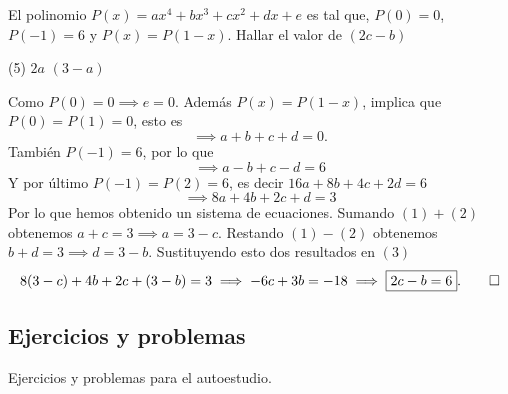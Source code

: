 \begin{example}
    El polinomio $P(x) = ax^4 + bx^3 + cx^2 + dx + e$ es tal que, $P(0) = 0$, $P(-1) = 6$ y $P(x) = P(1 - x)$.
    Hallar el valor de $(2c - b)$
    \begin{tasks}[label=\Alph*)](5)
        \task $2a$
        \task $(3 - a)$
    \end{tasks}
\end{example}

\begin{solution}
    Como $P(0) = 0 \implies e = 0$.
    Además $P(x) = P(1 - x)$, implica que $P(0) = P(1) = 0$, esto es
    \begin{equation}
        \implies a + b + c + d = 0.
    \end{equation}
    También $P(-1) = 6$, por lo que
    \begin{equation}
        \implies a - b + c - d = 6
    \end{equation}
    Y por último $P(-1) = P(2) = 6$, es decir $16a + 8b + 4c + 2d = 6$
    \begin{equation}
        \implies 8a + 4b + 2c + d = 3
    \end{equation}
    Por lo que hemos obtenido un sistema de ecuaciones.
    Sumando $(1) + (2)$ obtenemos $a + c = 3 \implies a = 3 - c$.
    Restando $(1) - (2)$ obtenemos $b + d = 3 \implies d = 3 - b$.
    Sustituyendo esto dos resultados en $(3)$
    \[
        8(3 - c) + 4b + 2c + (3 - b) = 3 \implies -6c + 3b = -18 \implies \boxed{2c - b = 6}. \qedhere
    \]
\end{solution}



\subsection{Ejercicios y problemas}
Ejercicios y problemas para el autoestudio.

\showLine

